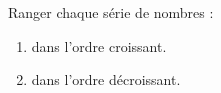 \begin{exercice}{}{}
    Ranger chaque série de nombres :
    \begin{enumerate}
       \item dans l'ordre croissant. \\ [1mm]
           \;  \;  \;  \;  \;  \smallskip
       \item dans l'ordre décroissant. \\ [1mm]
           \;  \;  \;  \;  \;  \; 
    \end{enumerate}
\end{exercice}